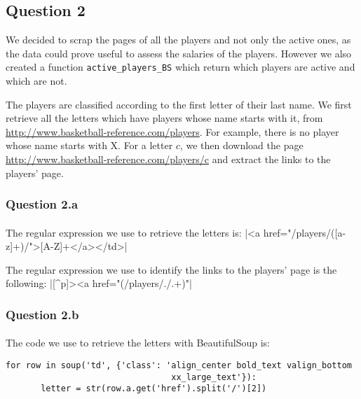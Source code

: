 
\subsection{Question 2}
\label{subsec:312}
We decided to scrap the pages of all the players and not only the active ones, as the data could prove useful to assess the salaries of the players. However we also created a function \verb|active_players_BS| which return which players are active and which are not.

The players are classified according to the first letter of their last name. We first retrieve all the letters which have players whose name starts with it, from \url{http://www.basketball-reference.com/players}. For example, there is no player whose name starts with X. For a letter $c$, we then download the page \url{http://www.basketball-reference.com/players/c} and extract the links to the players' page.

\subsubsection{Question 2.a}
\label{subsubsec:312a}
\paragraph{} The regular expression we use to retrieve the letters is: |<a href="/players/([a-z]+)/">[A-Z]+</a></td>|

The regular expression we use to identify the links to the players' page is the following:
|[^p]><a href="(/players/./.+)"|


\subsubsection{Question 2.b}
\label{subsubsec:312b}
\paragraph{}  The code we use to retrieve the letters with BeautifulSoup is:
\begin{verbatim}
for row in soup('td', {'class': 'align_center bold_text valign_bottom
                                 xx_large_text'}):
       letter = str(row.a.get('href').split('/')[2])
\end{verbatim}

